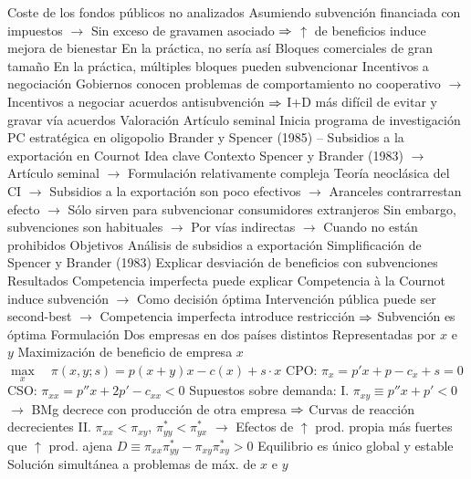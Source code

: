 \documentclass{nuevotema}
\begin{document}
\begin{esquemal}
				\4 Coste de los fondos públicos no analizados
				\4[] Asumiendo subvención financiada con impuestos
				\4[] $\to$ Sin exceso de gravamen asociado
				\4[] $\then$ $\uparrow$ de beneficios induce mejora de bienestar
				\4[] En la práctica, no sería así
				\4 Bloques comerciales de gran tamaño
				\4[] En la práctica, múltiples bloques pueden subvencionar
				\4 Incentivos a negociación
				\4[] Gobiernos conocen problemas de comportamiento no cooperativo
				\4[] $\to$ Incentivos a negociar acuerdos antisubvención
				\4[] $\then$ I+D más difícil de evitar y gravar vía acuerdos
			\3 Valoración
				\4 Artículo seminal
				\4 Inicia programa de investigación
				\4[] PC estratégica en oligopolio
		\2 Brander y Spencer (1985) -- Subsidios a la exportación en Cournot
			\3 Idea clave
				\4 Contexto
				\4[] Spencer y Brander (1983)
				\4[] $\to$ Artículo seminal
				\4[] $\to$ Formulación relativamente compleja
				\4[] Teoría neoclásica del CI
				\4[] $\to$ Subsidios a la exportación son poco efectivos
				\4[] $\to$ Aranceles contrarrestan efecto
				\4[] $\to$ Sólo sirven para subvencionar consumidores extranjeros
				\4[] Sin embargo, subvenciones son habituales
				\4[] $\to$ Por vías indirectas
				\4[] $\to$ Cuando no están prohibidos
				\4 Objetivos
				\4[] Análisis de subsidios a exportación
				\4[] Simplificación de Spencer y Brander (1983)
				\4[] Explicar desviación de beneficios con subvenciones
				\4 Resultados
				\4[] Competencia imperfecta puede explicar
				\4[] Competencia à la Cournot induce subvención
				\4[] $\to$ Como decisión óptima
				\4[] Intervención pública puede ser second-best
				\4[] $\to$ Competencia imperfecta introduce restricción
				\4[] $\then$ Subvención es óptima
			\3 Formulación
				\4 Dos empresas en dos países distintos
				\4[] Representadas por $x$ e $y$
				\4 Maximización de beneficio de empresa $x$
				\4[] $\underset{x}{\max} \quad \pi(x,y;s) = p(x+y) x - c(x) + s \cdot x$
				\4[] CPO: \quad $\pi_x  = p' x + p - c_x +s = 0$
				\4[] CSO: \quad $\pi_{xx} = p'' x  + 2p' - c_{xx} < 0$
				\4 Supuestos sobre demanda:
				\4[] I. $\pi_{xy} \equiv p'' x + p' < 0$
				\4[] $\to$ BMg decrece con producción de otra empresa
				\4[] $\then$ Curvas de reacción decrecientes
				\4[] II. $\pi_{xx} < \pi_{xy}$, $\pi^*_{yy} < \pi^*_{yx}$
				\4[] $\to$ Efectos de $\uparrow$ prod. propia más fuertes que $\uparrow$ prod. ajena
				\4[$\then$] $D \equiv \pi_{xx} \pi_{yy}^* - \pi_{xy} \pi_{xy}^* >0$
				\4[$\then$] Equilibrio es único global y estable
				\4 Solución simultánea a problemas de máx. de $x$ e $y$

\end{esquemal}
\end{document}
